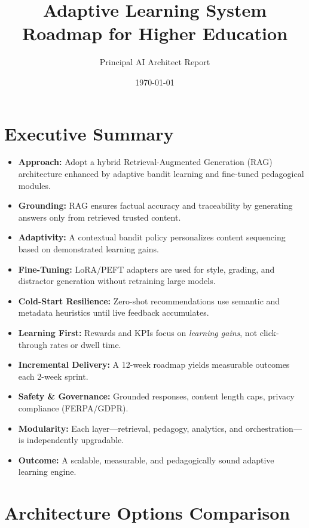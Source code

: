 \documentclass[12pt]{article}
\title{Adaptive Learning System Roadmap for Higher Education}
\author{Principal AI Architect Report}
\date{\today}
\begin{document}
\maketitle
\tableofcontents
\newpage

\section{Executive Summary}
\begin{itemize}[leftmargin=1.2cm]
  \item \textbf{Approach:} Adopt a hybrid Retrieval-Augmented Generation (RAG) architecture enhanced by adaptive bandit learning and fine-tuned pedagogical modules.
  \item \textbf{Grounding:} RAG ensures factual accuracy and traceability by generating answers only from retrieved trusted content.
  \item \textbf{Adaptivity:} A contextual bandit policy personalizes content sequencing based on demonstrated learning gains.
  \item \textbf{Fine-Tuning:} LoRA/PEFT adapters are used for style, grading, and distractor generation without retraining large models.
  \item \textbf{Cold-Start Resilience:} Zero-shot recommendations use semantic and metadata heuristics until live feedback accumulates.
  \item \textbf{Learning First:} Rewards and KPIs focus on \emph{learning gains}, not click-through rates or dwell time.
  \item \textbf{Incremental Delivery:} A 12-week roadmap yields measurable outcomes each 2-week sprint.
  \item \textbf{Safety \& Governance:} Grounded responses, content length caps, privacy compliance (FERPA/GDPR).
  \item \textbf{Modularity:} Each layer—retrieval, pedagogy, analytics, and orchestration—is independently upgradable.
  \item \textbf{Outcome:} A scalable, measurable, and pedagogically sound adaptive learning engine.
\end{itemize}

\section{Architecture Options Comparison}
\end{document}
